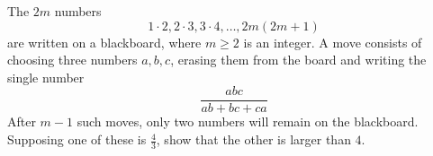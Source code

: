 The $2m$ numbers$$1\cdot 2, 2\cdot 3, 3\cdot 4,\hdots,2m(2m+1)$$are written on a blackboard, where $m\geq 2$ is an integer. A move consists of choosing three numbers $a, b, c$,  erasing them from the board and writing the single number$$\frac{abc}{ab+bc+ca}$$After $m-1$ such moves, only two numbers will remain on the blackboard. Supposing one of these is $\tfrac{4}{3}$,  show that the other is larger than $4$.